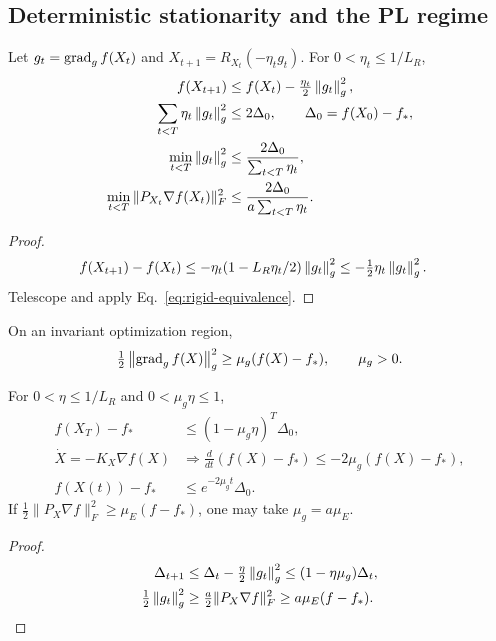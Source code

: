 \subsection{Deterministic stationarity and the PL regime}
\begin{theorem}
\label{thm:deterministic}
Let $g_t=\operatorname{grad}_g f(X_t)$ and $X_{t+1}=R_{X_t}(-\eta_tg_t)$.
For $0<\eta_t\leq1/L_R$,
\begin{align}
f(X_{t+1})&\leq f(X_t)-\tfrac{\eta_t}{2}\left\lVert g_t\right\rVert_g^2,\\
\sum_{t<T}\eta_t\left\lVert g_t\right\rVert_g^2&\leq2\Delta_0,\qquad
\Delta_0=f(X_0)-f_*,\\
\min_{t<T}\left\lVert g_t\right\rVert_g^2
&\leq\frac{2\Delta_0}{\sum_{t<T}\eta_t},\\
\min_{t<T}\|P_{X_t}\nabla f(X_t)\|_F^2
&\leq\frac{2\Delta_0}{a\sum_{t<T}\eta_t}.
\end{align}
\end{theorem}
\begin{proof}
\begin{align}
f(X_{t+1})-f(X_t)
&\leq-\eta_t(1-L_R\eta_t/2)\left\lVert g_t\right\rVert_g^2
\leq-\tfrac12\eta_t\left\lVert g_t\right\rVert_g^2 .
\end{align}
Telescope and apply Eq.~\eqref{eq:rigid-equivalence}.
\end{proof}

\begin{assumption}[Quotient PL]
\label{ass:rigid-pl}
On an invariant optimization region,
\begin{equation}
\tfrac12\left\lVert\operatorname{grad}_g f(X)\right\rVert_g^2
\geq\mu_g(f(X)-f_*),\qquad\mu_g>0 .
\end{equation}
\end{assumption}

\begin{theorem}
\label{thm:pl}
For $0<\eta\leq1/L_R$ and $0<\mu_g\eta\leq1$,
\begin{align}
f(X_T)-f_*&\leq(1-\mu_g\eta)^T\Delta_0,\\
\dot X=-K_X\nabla f(X)
&\Longrightarrow\frac{d}{dt}(f(X)-f_*)
\leq-2\mu_g(f(X)-f_*),\\
f(X(t))-f_*&\leq e^{-2\mu_gt}\Delta_0 .
\end{align}
If $\frac12\|P_X\nabla f\|_F^2\geq\mu_E(f-f_*)$,
one may take $\mu_g=a\mu_E$.
\end{theorem}
\begin{proof}
\begin{align}
\Delta_{t+1}
&\leq\Delta_t-\tfrac\eta2\left\lVert g_t\right\rVert_g^2
\leq(1-\eta\mu_g)\Delta_t,\\
\tfrac12\left\lVert g_t\right\rVert_g^2
&\geq\tfrac a2\|P_X\nabla f\|_F^2
\geq a\mu_E(f-f_*).
\end{align}
\end{proof}

